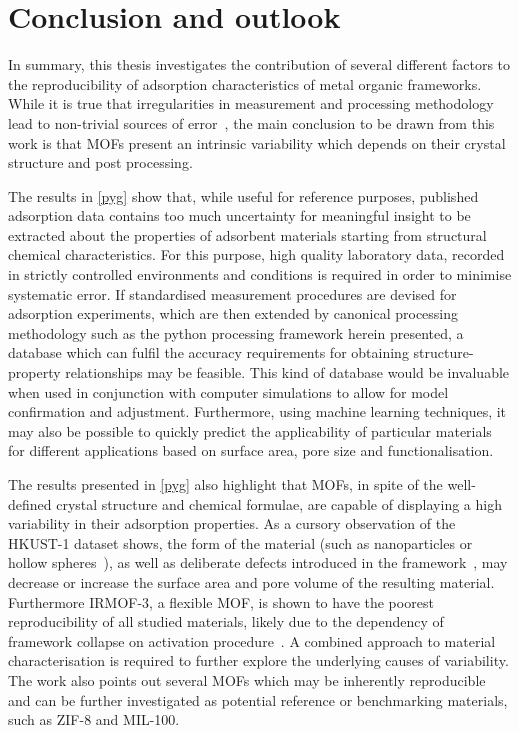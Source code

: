 
\graphicspath{ {\thisch/figures/} }

\chapter*{Conclusion and outlook}\label{conclusion}

In summary, this thesis investigates the contribution of several
different factors to the reproducibility of adsorption characteristics
of metal organic frameworks. While it is true that irregularities 
in measurement and processing methodology lead to non-trivial
sources of error~\cite{nguyenReferenceHighpressureCO22018, %
parkHowReproducibleAre2017}, the main conclusion to be drawn 
from this work is that \glspl{MOF}
present an intrinsic variability which depends on their crystal
structure and post processing.

The results in \autoref{pyg} show that, while useful for reference
purposes, published adsorption data contains too much
uncertainty for meaningful insight to be extracted about the properties
of adsorbent materials starting from structural chemical characteristics.
For this purpose, high quality laboratory data, recorded in strictly 
controlled environments and conditions is required in order to 
minimise systematic error. If standardised measurement procedures 
are devised for adsorption experiments, which are then extended 
by canonical processing methodology such as the python processing 
framework herein presented, a database which can fulfil the accuracy
requirements for obtaining structure-property relationships may be
feasible. This kind of database would be invaluable when used in
conjunction with computer simulations
to allow for model confirmation and adjustment. Furthermore, using machine
learning techniques, it may also be possible to quickly predict the
applicability of particular materials for different applications
based on surface area, pore size and functionalisation.

The results presented in \autoref{pyg} also highlight that
\glspl{MOF}, in spite of the well-defined crystal structure and chemical formulae,
are capable of displaying a high variability in their adsorption
properties. 
As a cursory observation of the HKUST-1 dataset shows, the form of the 
material (such as nanoparticles or hollow
spheres~\cite{liControllableSynthesisMetal2013}), as well as 
deliberate defects introduced in the 
framework~\cite{barinDefectCreationLinker2014}, may decrease or 
increase the surface area and pore volume of the resulting material.
Furthermore IRMOF-3, a flexible \gls{MOF}, 
is shown to have the poorest reproducibility of all studied materials,
likely due to the dependency of framework collapse on 
activation procedure~\cite{engelActivationDependentBreathingFlexible2017}.
A combined approach to material characterisation
is required to further explore the underlying causes of variability.
The work also points out several \glspl{MOF} which may
be inherently reproducible and can be further investigated as 
potential reference or benchmarking materials, such as 
ZIF-8 and MIL-100.

